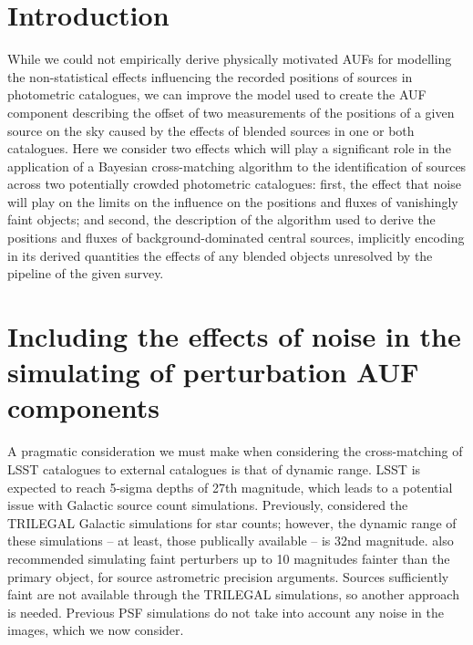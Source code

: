 \documentclass[fleqn,usenatbib]{mnras}
\begin{document}
\section{Introduction}
While we could not empirically derive physically motivated AUFs for modelling the non-statistical effects influencing the recorded positions of sources in photometric catalogues, we can improve the model used to create the AUF component describing the offset of two measurements of the positions of a given source on the sky caused by the effects of blended sources in one or both catalogues. Here we consider two effects which will play a significant role in the application of a Bayesian cross-matching algorithm to the identification of sources across two potentially crowded photometric catalogues: first, the effect that noise will play on the limits on the influence on the positions and fluxes of vanishingly faint objects; and second, the description of the algorithm used to derive the positions and fluxes of background-dominated central sources, implicitly encoding in its derived quantities the effects of any blended objects unresolved by the pipeline of the given survey.

\section{Including the effects of noise in the simulating of perturbation AUF components}
\label{sec:noise effects}
A pragmatic consideration we must make when considering the cross-matching of LSST catalogues to external catalogues is that of dynamic range. LSST is expected to reach 5-sigma depths of 27th magnitude, which leads to a potential issue with Galactic source count simulations. Previously, \citet{2018MNRAS.481.2148W} considered the TRILEGAL \citep{Girardi2005} Galactic simulations for star counts; however, the dynamic range of these simulations -- at least, those publically available -- is 32nd magnitude. \citet{2018MNRAS.481.2148W} also recommended simulating faint perturbers up to 10 magnitudes fainter than the primary object, for source astrometric precision arguments. Sources sufficiently faint are not available through the TRILEGAL simulations, so another approach is needed. Previous PSF simulations do not take into account any noise in the images, which we now consider.
\end{document}
